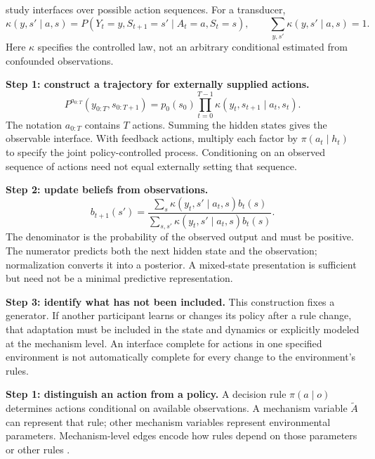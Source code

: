 \documentclass[11pt,letterpaper]{article}
\begin{document}
\citet[PDF pp. 4--6, 9--10]{rosas2025vat} study interfaces over possible action sequences. For a transducer,
\begin{equation}
 \kappa(y,s'\mid a,s)=P(Y_t=y,S_{t+1}=s'\mid A_t=a,S_t=s),
 \qquad\sum_{y,s'}\kappa(y,s'\mid a,s)=1.
\end{equation}
Here $\kappa$ specifies the controlled law, not an arbitrary conditional estimated from confounded observations.

\textbf{Step 1: construct a trajectory for externally supplied actions.}
\begin{equation}
 P^{a_{0:T}}(y_{0:T},s_{0:T+1})
 =p_0(s_0)\prod_{t=0}^{T-1}\kappa(y_t,s_{t+1}\mid a_t,s_t).
\end{equation}
The notation $a_{0:T}$ contains $T$ actions. Summing the hidden states gives the observable interface. With feedback actions, multiply each factor by $\pi(a_t\mid h_t)$ to specify the joint policy-controlled process. Conditioning on an observed sequence of actions need not equal externally setting that sequence.

\textbf{Step 2: update beliefs from observations.}
\begin{equation}
 b_{t+1}(s')=\frac{\sum_s\kappa(y_t,s'\mid a_t,s)b_t(s)}
 {\sum_{s,s'}\kappa(y_t,s'\mid a_t,s)b_t(s)}.
\end{equation}
The denominator is the probability of the observed output and must be positive. The numerator predicts both the next hidden state and the observation; normalization converts it into a posterior. A mixed-state presentation is sufficient but need not be a minimal predictive representation.

\textbf{Step 3: identify what has not been included.} This construction fixes a generator. If another participant learns or changes its policy after a rule change, that adaptation must be included in the state and dynamics or explicitly modeled at the mechanism level. An interface complete for actions in one specified environment is not automatically complete for every change to the environment's rules.


\textbf{Step 1: distinguish an action from a policy.} A decision rule $\pi(a\mid o)$ determines actions conditional on available observations. A mechanism variable $\widetilde A$ can represent that rule; other mechanism variables represent environmental parameters. Mechanism-level edges encode how rules depend on those parameters or other rules \citep[PDF pp. 10--12]{hammond2023games}.
\end{document}
